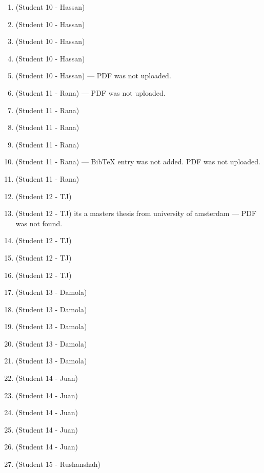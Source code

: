 \documentclass{article}
\begin{document}
\begin{enumerate}[label=\#\arabic*,noitemsep,nolistsep]
\item \cite{siu1997combinatorics} (Student 10 - Hassan)
\item \cite{denes1990new} (Student 10 - Hassan)
\item \cite{etzion1988constructions} (Student 10 - Hassan)
\item \cite{hurlbert1996existence} (Student 10 - Hassan)
\item \cite{nissanov1995brain} (Student 10 - Hassan) --- PDF was not uploaded.
\item \cite{millan2026ritmo} (Student 11 - Rana) --- PDF was not uploaded.
\item \cite{jackson2009research} (Student 11 - Rana)
\item \cite{pages2005optimised} (Student 11 - Rana)
\item \cite{mitchell1997bruijn} (Student 11 - Rana)
\item \cite{delorme1998spectrum} (Student 11 - Rana) --- BibTeX entry was not added. PDF was not uploaded.
\item \cite{burkhardt1994implementing} (Student 11 - Rana)
\item \cite{schusselbauer2021dothraki} (Student 12 - TJ)
\item \cite{kapinya2004evolutionary} (Student 12 - TJ) its a masters thesis from university of amsterdam --- PDF was not found.
\item \cite{burns1992coding} (Student 12 - TJ)
\item \cite{berkowitz2016robust} (Student 12 - TJ)
\item \cite{becher2023nested} (Student 12 - TJ)
\item \cite{szentandrasi2012uniform} (Student 13 - Damola)
\item \cite{bruckstein2012simple} (Student 13 - Damola)
\item \cite{wijenayake2015dual} (Student 13 - Damola)
\item \cite{zhu2022hydramarker} (Student 13 - Damola)
\item \cite{herout2013five} (Student 13 - Damola)
\item \cite{paterson1996newI} (Student 14 - Juan)
\item \cite{zhou2021m} (Student 14 - Juan)
\item \cite{albitar2007design} (Student 14 - Juan)
\item \cite{luo2018multi} (Student 14 - Juan)
\item \cite{elahi2023single} (Student 14 - Juan)
\item \cite{salvi2004pattern} (Student 15 - Rushanshah)

\end{enumerate}
\end{document}
